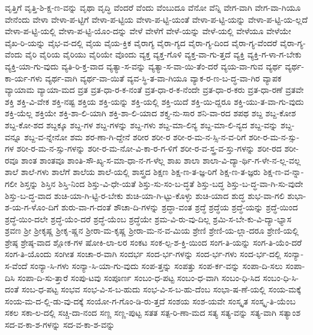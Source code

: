 {ವೃತ್ತಿಗೆ
ವೃತ್ತಿ-ಶಿ-ಕ್ಷ-ಣ-ವನ್ನು
ವೃಥಾ
ವೃದ್ಧಿ
ವೆಂದರೆ
ವೆಂದು
ವೆಂಬುದೂ
ವೆನೋ
ವೆನ್ನಿ
ವೇಗ-ವಾಗಿ
ವೇಗ-ವಾ-ಗಿಯೂ
ವೇನೆಂದು
ವೇಳಾ
ವೇಳಾ-ಪ-ಟ್ಟಿಗೆ
ವೇಳಾ-ಪ-ಟ್ಟಿಯ
ವೇಳಾ-ಪ-ಟ್ಟಿ-ಯಂತೆ
ವೇಳಾ-ಪ-ಟ್ಟಿ-ಯನ್ನು
ವೇಳಾ-ಪ-ಟ್ಟಿ-ಯ-ಲ್ಲದೆ
ವೇಳಾ-ಪ-ಟ್ಟಿ-ಯಲ್ಲಿ
ವೇಳಾ-ಪ-ಟ್ಟಿ-ಯೊಂ-ದನ್ನು
ವೇಳೆ
ವೇಳೆಗೆ
ವೇಳೆ-ಯನ್ನು
ವೇಳೆ-ಯಲ್ಲಿ
ವೇಳೆಯೂ
ವೇಳೆಯೇ
ವೈಖ-ರಿ-ಯನ್ನು
ವೈಭ-ವ-ದಲ್ಲಿ
ವೈಯ
ವೈಯ-ಕ್ತಿಕ
ವೈರಾಗ್ಯ
ವೈರಾ-ಗ್ಯದ
ವೈರಾ-ಗ್ಯ-ದಿಂದ
ವೈರಾ-ಗ್ಯ-ವೆಂದರೆ
ವೈರಾ-ಗ್ಯ-ವೆಂದು
ವೈರಿ
ವೈರಿಯ
ವೈರಿಯು
ವೈರಿಯೇ
ವೊಂದು
ವ್ಯಕ್ತ
ವ್ಯಕ್ತ-ಗೊಳಿ
ವ್ಯಕ್ತ-ವಾ-ಗು-ತ್ತದೆ
ವ್ಯಕ್ತಿ
ವ್ಯಕ್ತಿ-ಗ-ಳಾ-ಗ-ಬೇಕು
ವ್ಯಕ್ತಿ-ಯಾ-ಗು-ವುದು
ವ್ಯತಿ-ರಿ-ಕ್ತ-ವಾದ
ವ್ಯತ್ಯಾ-ಸ-ವನ್ನು
ವ್ಯತ್ಯಾ-ಸ-ವಾ-ಯಿ-ತೆಂ-ದರೆ
ವ್ಯಯ-ವಾ-ಗುವ
ವ್ಯರ್ಥ
ವ್ಯರ್ಥ-ಕಾ-ರ್ಯ-ಗಳು
ವ್ಯರ್ಥ-ವಾಗಿ
ವ್ಯರ್ಥ-ವಾ-ಯಿತೆ
ವ್ಯವ-ಸ್ಥಿ-ತ-ವಾ-ಗಿಯೂ
ವ್ಯಾಕ-ರ-ಣ-ಬ-ದ್ಧ-ವಾ-ಗಿರ
ವ್ಯಾಪಕ
ವ್ಯಾಯಾಮ
ವ್ಯಾಯಾ-ಮದ
ವ್ರತ
ವ್ರತ-ಧಾ-ರ-ಕ-ನಂತೆ
ವ್ರತ-ಧಾ-ರ-ಕ-ನೆಂದೇ
ವ್ರತ-ಧಾ-ರ-ಕರು
ವ್ರತ-ಧಾ-ರಣೆ
ವ್ರತವೇ
ಶಕ್ತಿ
ಶಕ್ತಿ-ವಿ-ವೇಕ
ಶಕ್ತಿ-ನಷ್ಟ
ಶಕ್ತಿಯ
ಶಕ್ತಿ-ಯನ್ನು
ಶಕ್ತಿ-ಯಲ್ಲಿ
ಶಕ್ತಿ-ಯಿದೆ
ಶಕ್ತಿ-ಯಿ-ದ್ದರೂ
ಶಕ್ತಿ-ಯು-ತ-ವಾ-ಗು-ವುದು
ಶಕ್ತಿ-ಯೆಲ್ಲ
ಶಕ್ತಿಯೇ
ಶಕ್ತಿ-ಶಾ-ಲಿ-ಯಾಗಿ
ಶಕ್ತಿ-ಶಾ-ಲಿ-ಯಾದ
ಶಕ್ತ್ಯ-ನು-ಸಾರ
ಶನಿ-ವಾ-ರದ
ಶಪಥ
ಶಬ್ದ
ಶಬ್ದ-ಕೋಶ
ಶಬ್ದ-ಕೋ-ಶದ
ಶಬ್ದಕ್ಕೂ
ಶಬ್ದ-ಗಳ
ಶಬ್ದ-ಗಳನ್ನು
ಶಬ್ದ-ಗಳು
ಶಬ್ದ-ಮಾ-ಲಿನ್ಯ
ಶಬ್ದ-ಮಾ-ಲಿ-ನ್ಯದ
ಶಬ್ದ-ವನ್ನು
ಶಬ್ದ-ವನ್ನೂ
ಶಬ್ದ-ವ-ನ್ನೇನೋ
ಶಮ
ಶರ-ಣಾ-ಗಿ-ದ್ದೇನೆ
ಶರೀರ
ಶರೀ-ರ
ಶರೀ-ರ-ಮ-ನ-ಸ್ಸಿ-ನ-ವ-ರಿಗೆ
ಶರೀ-ರ-ಮ-ನ-ಸ್ಸು-ಗಳ
ಶರೀ-ರ-ಮ-ನ-ಸ್ಸು-ಗಳನ್ನು
ಶರೀ-ರ-ಮ-ನೋ-ವಿ-ಕಾ-ರ-ಗ-ಳಿಗೆ
ಶರೀ-ರ-ವ-ಸ್ತ್ರ-ವ-ಸ್ತು-ಗಳನ್ನು
ಶರೀ-ರದ
ಶರೀ-ರವೂ
ಶಾಂತ
ಶಾಂತವೂ
ಶಾಂತಿ-ಸೌ-ಖ್ಯ-ಸ-ಮಾ-ಧಾ-ನ-ಗ-ಳೆಲ್ಲ
ಶಾಖ
ಶಾಲಾ
ಶಾಲಾ-ವಿ-ದ್ಯಾ-ರ್ಥಿ-ಗ-ಳೇ-ನ-ಲ್ಲ-ವಲ್ಲ
ಶಾಲೆ
ಶಾಲೆ-ಗಳು
ಶಾಲೆಗೆ
ಶಾಲೆಯ
ಶಾಲೆ-ಯಲ್ಲಿ
ಶಾಸ್ತ್ರದ
ಶಿಕ್ಷಣ
ಶಿಕ್ಷ-ಣ-ತ-ಜ್ಞ-ರಿಗೆ
ಶಿಕ್ಷ-ಣ-ತ-ಜ್ಞರು
ಶಿಕ್ಷ-ಣ-ವ-ನ್ನಾ-ಗಲೀ
ಶಿಸ್ತನ್ನು
ಶಿಸ್ತಿನ
ಶಿಸ್ತಿ-ನಿಂದ
ಶಿಸ್ತು-ವಿ-ಧೇ-ಯತೆ
ಶಿಸ್ತು-ಸು-ಸಂ-ಬ-ದ್ಧತೆ
ಶಿಸ್ತು-ಬದ್ಧ
ಶಿಸ್ತು-ಬ-ದ್ಧ-ವಾ-ಗಿ-ಸು-ವುದೇ
ಶಿಸ್ತು-ಬ-ದ್ಧ-ವಾದ
ಶುಚಿ-ಯಾ-ಗಿ-ಟ್ಟಿ-ರ-ಬೇಕು
ಶುಚಿ-ಯಾ-ಗಿ-ಟ್ಟು-ಕೊಳ್ಳು
ಶುಚಿ-ಯಾದ
ಶುದ್ಧ
ಶುಭ-ವಾ-ಗಲಿ
ಶುಭಾ-ಶ-ಯ-ಗ-ಳೊಂ-ದಿಗೆ
ಶುರು-ವಾ-ಗ-ದಂತೆ
ಶೌಚಾ-ದಿ-ಗಳನ್ನು
ಶ್ರದ್ಧಾ-ವಂತ
ಶ್ರದ್ಧೆ
ಶ್ರದ್ಧೆಯ
ಶ್ರದ್ಧೆ-ಯನ್ನು
ಶ್ರದ್ಧೆ-ಯಿಂದ
ಶ್ರದ್ಧೆ-ಯಿಂ-ದಲೇ
ಶ್ರದ್ಧೆ-ಯೆಂ-ದರೆ
ಶ್ರದ್ಧೆ-ಯೆಂಬ
ಶ್ರದ್ಧೆಯೇ
ಶ್ರಮ-ವಿ-ರು-ವು-ದಿಲ್ಲ
ಶ್ರಮಿ-ಸ-ಬೇ-ಕು-ವಿ-ದ್ಯಾ-ಭ್ಯಾಸ
ಶ್ರವಣ
ಶ್ರೀ
ಶ್ರೀಕೃಷ್ಣ
ಶ್ರೀಕೃ-ಷ್ಣನ
ಶ್ರೀರಾ-ಮ-ಕೃಷ್ಣ
ಶ್ರೀರಾ-ಮ-ನ-ವ-ಮಿಯ
ಶ್ರೇಣಿ
ಶ್ರೇಣಿ-ಯ-ಲ್ಲಾ-ದರೂ
ಶ್ರೇಣಿ-ಯಲ್ಲಿ
ಶ್ರೇಷ್ಠ
ಶ್ರೇಷ್ಠ-ವಾದ
ಶ್ಲೋಕ-ಗಳ
ಷೋಕಿ-ಲಾ-ಲರ
ಸಂಕಟ
ಸಂಕ-ಲ್ಪ-ಶ-ಕ್ತಿ-ಯಿಂದ
ಸಂಗ-ತಿ-ಯನ್ನು
ಸಂಗ-ತಿ-ಯೆಂ-ದರೆ
ಸಂಗ-ತಿ-ಯೊಂದು
ಸಂಗೀತ
ಸಂಚಾ-ರ-ವಾಗಿ
ಸಂದರ್ಭ
ಸಂದ-ರ್ಭ-ಗಳನ್ನು
ಸಂದ-ರ್ಭ-ಗಳು
ಸಂದ-ರ್ಭ-ದಲ್ಲಿ
ಸಂನ್ಯಾ-ಸ-ವೆಂದೆ
ಸಂನ್ಯಾ-ಸಿ-ಗಳು
ಸಂನ್ಯಾ-ಸಿ-ಯಾ-ಗು-ವುದು
ಸಂಪ-ತ್ತನ್ನು
ಸಂಪತ್ತು
ಸಂಪ-ರ್ಕ-ವನ್ನು
ಸಂಪಾ-ದಿ-ಸಲು
ಸಂಪಾ-ದಿಸಿ
ಸಂಪಾ-ದಿ-ಸು-ತ್ತಾರೆ
ಸಂಪು-ಟವು
ಸಂಪೂರ್ಣ
ಸಂಬಂ-ಧ-ಪಟ್ಟ
ಸಂಬಂ-ಧ-ವಾಗಿ
ಸಂಬಂ-ಧಿ-ಸಿದ
ಸಂಬಂ-ಧಿ-ಸಿ-ದಂತೆ
ಸಂಬ-ಧ-ಪಟ್ಟ
ಸಂಭವ
ಸಂಭ-ವಿ-ಸ-ಬ-ಹುದು
ಸಂಭ-ವಿ-ಸ-ಬ-ಹು-ದೆಂಬ
ಸಂಭಾ-ಷ-ಣೆ-ಯಲ್ಲಿ
ಸಂಯ-ಮಕ್ಕೆ
ಸಂಯ-ಮ-ದ-ಲ್ಲಿ-ಡು-ವು-ದಕ್ಕೆ
ಸಂಯೋ-ಗ-ಗೊಂ-ಡಿ-ರು-ತ್ತದೆ
ಸಂಶಯ
ಸಂಶ-ಯವೇ
ಸಂಸ್ಕೃತ
ಸಂಸ್ಕೃ-ತಿ-ಯೆಂಬ
ಸಕಲ
ಸಕಾ-ಲ-ದಲ್ಲಿ
ಸಚ್ಚಿ-ದಾ-ನಂದ
ಸಣ್ಣ
ಸಣ್ಣ-ಪುಟ್ಟ
ಸತತ
ಸತ್ಪ-ರಿ-ಣಾ-ಮದ
ಸತ್ಯ
ಸತ್ಯ-ವನ್ನು
ಸತ್ಯ-ವಾಗಿ
ಸತ್ಯಾಂಶ
ಸದ-ವ-ಕಾ-ಶ-ಗಳನ್ನು
ಸದ-ವ-ಕಾ-ಶ-ವನ್ನು
}
